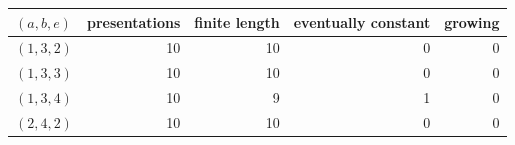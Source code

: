 \begin{tabular}{@{}lrrrr@{}}
\toprule
$(a,b,e)$ & presentations & finite length & eventually constant & growing\\
\midrule
$(1,3,2)$ & 10 & 10 & 0 & 0\\
$(1,3,3)$ & 10 & 10 & 0 & 0\\
$(1,3,4)$ & 10 & 9 & 1 & 0\\
$(2,4,2)$ & 10 & 10 & 0 & 0\\
\bottomrule
\end{tabular}
